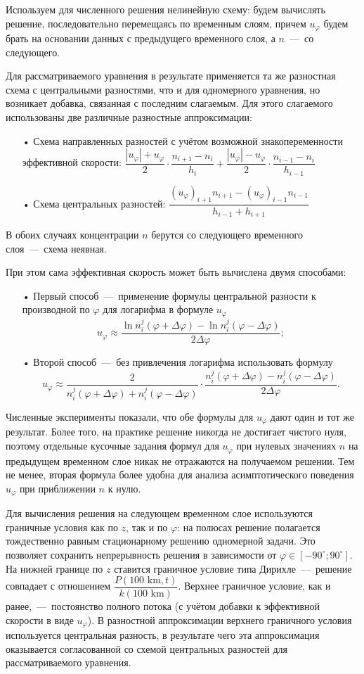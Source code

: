 \documentclass[14pt, a4paper, fleqn]{extarticle}
\begin{document}
Используем для численного решения нелинейную схему: будем вычислять решение, последовательно перемещаясь по временным слоям, причем $u_\varphi$ будем брать на основании данных с предыдущего временного слоя, а $n$~---~со следующего.

Для рассматриваемого уравнения в результате применяется та же разностная схема с центральными разностями, что и для одномерного уравнения, но возникает добавка, связанная с последним слагаемым. Для этого слагаемого использованы две различные разностные аппроксимации:
\begin{itemize}
\item[•] Схема направленных разностей с учётом возможной знакопеременности эффективной скорости: $\dfrac{|u_\varphi|+u_\varphi}{2}\cdot\dfrac{n_{i+1}-n_i}{h_i} + \dfrac{|u_\varphi|-u_\varphi}{2}\cdot\dfrac{n_{i-1}-n_i}{h_{i-1}}$
\item[•] Схема центральных разностей: $\dfrac{(u_\varphi)_{i+1}n_{i+1}-(u_\varphi)_{i-1}n_{i-1}}{h_{i-1}+h_{i+1}}$
\end{itemize}
В обоих случаях концентрации $n$ берутся со следующего временного слоя~---~схема неявная.

\smallskip

При этом сама эффективная скорость может быть вычислена двумя способами: 
\begin{itemize}
\item[•] Первый способ~---~применение формулы центральной разности к производной по $\varphi$ для логарифма в формуле $u_\varphi$ $$u_\varphi\approx \dfrac{\ln n^j_i(\varphi+\Delta\varphi)-\ln n^j_i(\varphi-\Delta\varphi)}{2\Delta\varphi};$$ 
\item[•] Второй способ~---~без привлечения логарифма использовать формулу $$u_\varphi \approx \dfrac{2}{n_i^j(\varphi+\Delta\varphi)+n_i^j(\varphi-\Delta\varphi)}\cdot\dfrac{n_i^j(\varphi+\Delta\varphi)-n_i^j(\varphi-\Delta\varphi)}{2\Delta\varphi}.$$
\end{itemize}

Численные эксперименты показали, что обе формулы для $u_\varphi$ дают один и тот же результат. Более того, на практике решение никогда не достигает чистого нуля, поэтому отдельные кусочные задания формул для $u_\varphi$ при нулевых значениях $n$ на предыдущем временном слое никак не отражаются на получаемом решении. Тем не менее, вторая формула более удобна для анализа асимптотического поведения $u_\varphi$ при приближении $n$ к нулю.

Для вычисления решения на следующем временном слое используются граничные условия как по $z$, так и по $\varphi$: на полюсах решение полагается тождественно равным стационарному решению одномерной задачи. Это позволяет сохранить непрерывность решения в зависимости от $\varphi \in [-90^\circ; 90^\circ]$. На нижней границе по $z$ ставится граничное условие типа Дирихле~---~решение совпадает с отношением $\dfrac{P(100\mbox{ km}, t)}{k(100\mbox{ km})}$. Верхнее граничное условие, как и ранее,~---~постоянство полного потока (с учётом добавки к эффективной скорости в виде $u_\varphi$). В разностной аппроксимации верхнего граничного условия используется центральная разность, в результате чего эта аппроксимация оказывается согласованной со схемой центральных разностей для рассматриваемого уравнения.
\end{document}
